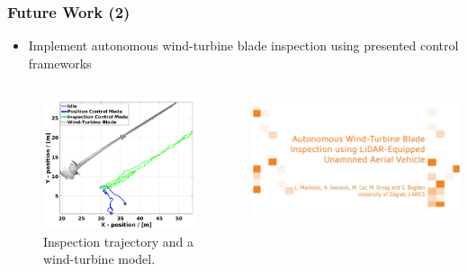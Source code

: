 \begin{frame}
	\frametitle{Future Work (2)}
	\begin{itemize}
		\item Implement autonomous wind-turbine blade inspection using presented control frameworks
	\end{itemize}
	\begin{columns}
		\begin{column}{0.5\textwidth}\centering
			\begin{figure}[H]
				\centering
				\includegraphics[width=0.8\columnwidth]{figures/uav_position_experiment_resized.pdf}
				\caption{Inspection trajectory and a wind-turbine model.}
			\end{figure}
		\end{column}
		\begin{column}{0.5\textwidth}\centering
			\href{video_presentation.mp4}{\includegraphics[width=\columnwidth]{figures/title_screen.png}}
		\end{column}
	\end{columns}
\end{frame}


